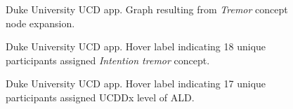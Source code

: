 \documentclass[10pt, letterpaper]{article}
\begin{document}
\begin{spacing}{1.0}
\begin{figure}[H]
    \centering
    \caption{Duke University UCD app.  Graph resulting from \textit{Tremor} concept node expansion.}
    \label{fg:UCD08}
\end{figure}

\begin{figure}[H]
    \centering
    \caption{Duke University UCD app.  Hover label indicating 18 unique participants assigned \textit{Intention tremor} concept.}
    \label{fg:UCD09}
\end{figure}

\begin{figure}[H]
    \centering
    \caption{Duke University UCD app.  Hover label indicating 17 unique participants assigned UCDDx level of ALD.}
    \label{fg:UCD10}
\end{figure}


\end{spacing}
\end{document}
